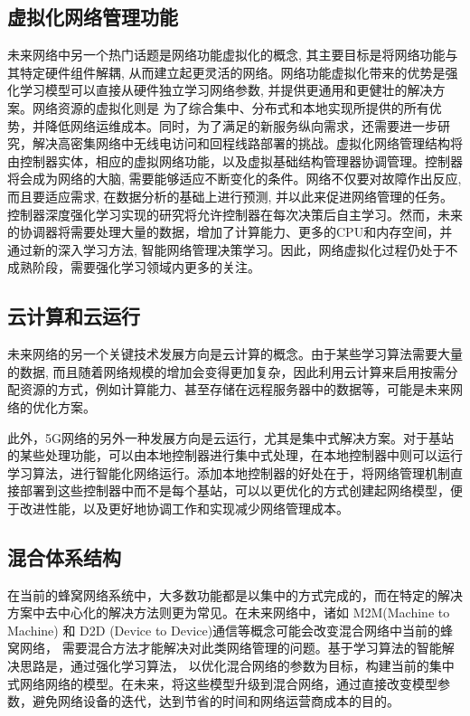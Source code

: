 \documentclass{IEEEtran}
\begin{document}
\subsection{虚拟化网络管理功能}

未来网络中另一个热门话题是网络功能虚拟化的概念, 其主要目标是将网络功能与其特定硬件组件解耦, 从而建立起更灵活的网络。网络功能虚拟化带来的优势是强化学习模型可以直接从硬件独立学习网络参数, 并提供更通用和更健壮的解决方案。网络资源的虚拟化则是 为了综合集中、分布式和本地实现所提供的所有优势，并降低网络运维成本。同时，为了满足的新服务纵向需求，还需要进一步研究，解决高密集网络中无线电访问和回程线路部署的挑战。虚拟化网络管理结构将由控制器实体，相应的虚拟网络功能，以及虚拟基础结构管理器协调管理。控制器将会成为网络的大脑, 需要能够适应不断变化的条件。网络不仅要对故障作出反应, 而且要适应需求, 在数据分析的基础上进行预测, 并以此来促进网络管理的任务。控制器深度强化学习实现的研究将允许控制器在每次决策后自主学习。然而，未来的协调器将需要处理大量的数据，增加了计算能力、更多的CPU和内存空间，并通过新的深入学习方法, 智能网络管理决策学习。因此，网络虚拟化过程仍处于不成熟阶段，需要强化学习领域内更多的关注。

\subsection{云计算和云运行}
未来网络的另一个关键技术发展方向是云计算的概念。由于某些学习算法需要大量的数据, 而且随着网络规模的增加会变得更加复杂，因此利用云计算来启用按需分配资源的方式，例如计算能力、甚至存储在远程服务器中的数据等，可能是未来网络的优化方案。

此外，5G网络的另外一种发展方向是云运行，尤其是集中式解决方案。对于基站的某些处理功能，可以由本地控制器进行集中式处理，在本地控制器中则可以运行学习算法，进行智能化网络运行。添加本地控制器的好处在于，将网络管理机制直接部署到这些控制器中而不是每个基站，可以以更优化的方式创建起网络模型，便于改进性能，以及更好地协调工作和实现减少网络管理成本。

\subsection{混合体系结构}
在当前的蜂窝网络系统中，大多数功能都是以集中的方式完成的，而在特定的解决方案中去中心化的解决方法则更为常见。在未来网络中，诸如 M2M(Machine to Machine) 和 D2D (Device to Device)通信等概念可能会改变混合网络中当前的蜂窝网络， 需要混合方法才能解决对此类网络管理的问题。基于学习算法的智能解决思路是，通过强化学习算法， 以优化混合网络的参数为目标，构建当前的集中式网络网络的模型。在未来，将这些模型升级到混合网络，通过直接改变模型参数，避免网络设备的迭代，达到节省的时间和网络运营商成本的目的。
\end{document}
